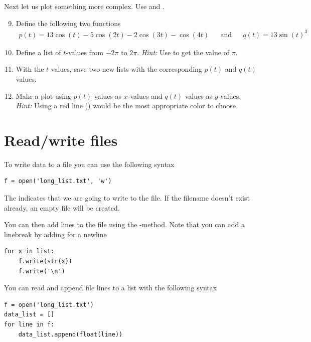 \documentclass{article}
\begin{document}
Next let us plot something more complex. Use  and .

\begin{enumerate}
    \setcounter{enumi}{8}
    \item Define the following two functions
    \begin{align}
         p(t) = 13\cos(t) - 5 \cos(2t) - 2 \cos(3t) - \cos(4t) && \text{and} && q(t) = 13\sin(t)^3 
    \end{align}

    \item Define a list of $t$-values from $-2\pi$ to $2\pi$.
      {\em Hint:} Use  to get the value of $\pi$.

    \item With the $t$ values, save two new lists with the corresponding $p(t)$ and $q(t)$ values.

    \item Make a plot using $p(t)$ values as $x$-values and $q(t)$ values as $y$-values.
        {\em Hint:} Using a red line () would be the most appropriate color to choose.


\end{enumerate}


\section{Read/write files}


To write data to a file you can use the following syntax
\begin{lstlisting}
f = open('long_list.txt', 'w')
\end{lstlisting}

The  indicates that we are going to write to the file.
If the filename doesn't exist already, an empty file will be created.

You can then add lines to the file using the -method.
Note that you can add a linebreak by adding  for a newline

\begin{lstlisting}
for x in list:
    f.write(str(x))
    f.write('\n')
\end{lstlisting}

You can read and append file lines to a list with the following syntax
\begin{lstlisting}
f = open('long_list.txt')
data_list = []
for line in f:
    data_list.append(float(line))
\end{lstlisting}
\end{document}
